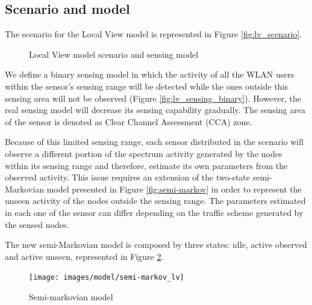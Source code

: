 \subsection{Scenario and model} \label{sec:lv_scenario}
The scenario for the Local View model is represented in Figure \ref{fig:lv_scenario}. 

\begin{figure}[h!]
	\centering
	\caption{Local View model scenario and sensing model}
	\label{fig:lv_scenario_and_sensing}
\end{figure}

We define a binary sensing model in which the activity of all the \acs{WLAN} users within the sensor's sensing range will be detected while the ones outside this sensing area will not be observed (Figure \ref{fig:lv_sensing_binary}). However, the real sensing model will decrease its sensing capability gradually. The sensing area of the sensor is denoted as Clear Channel Assessment (\acs{CCA}) zone.

Because of this limited sensing range, each sensor distributed in the scenario will observe a different portion of the spectrum activity generated by the nodes within its sensing range and therefore, estimate its own parameters from the observed activity. This issue requires an extension of the two-state semi-Markovian model presented in Figure \ref{fig:semi-markov} in order to represent the unseen activity of the nodes outside the sensing range. The parameters estimated in each one of the sensor can differ depending on the traffic scheme generated by the sensed nodes.

The new semi-Markovian model is composed by three states: idle, active observed and active unseen, represented in Figure \ref{fig:semi-markov_local}. 

\begin{figure}[h]
	\centering
	\texttt{[image: images/model/semi-markov\_lv]}
	\caption{Semi-markovian model \cite{marcello}}
	\label{fig:semi-markov_local}
\end{figure}


